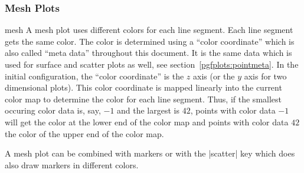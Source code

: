 \subsubsection{Mesh Plots}
\label{sec:2d:mesh}
\begin{plottype}{mesh}
	A mesh plot uses different colors for each line segment. Each line segment gets the same color. The color is determined using a ``color coordinate'' which is also called ``meta data'' throughout this document. It is the same data which is used for surface and scatter plots as well, see section~\ref{pgfplots:pointmeta}. In the initial configuration, the ``color coordinate'' is the $z$ axis (or the $y$ axis for two dimensional plots). This color coordinate is mapped linearly into the current color map to determine the color for each line segment. Thus, if the smallest occuring color data is, say, $-1$ and the largest is $42$, points with color data $-1$ will get the color at the lower end of the color map and points with color data $42$ the color of the upper end of the color map.

\pgfplotsexpensiveexample
\begin{codeexample}[]
\end{codeexample}

	A mesh plot can be combined with markers or with the |scatter| key which does also draw markers in different colors.

\pgfplotsexpensiveexample
\begin{codeexample}[]
\end{codeexample}

\pgfplotsexpensiveexample
\begin{codeexample}[]
\end{codeexample}


\end{plottype}
